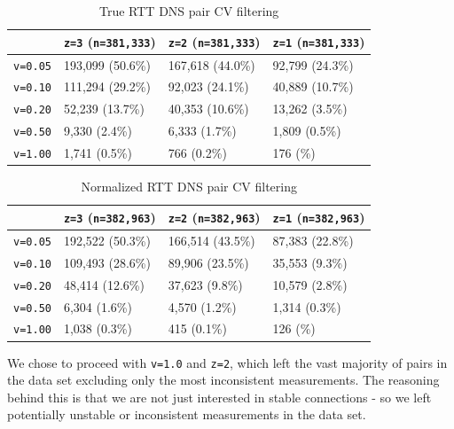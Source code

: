 \begin{table}[htb]
    \centering
    \begin{tabular}{p{1.6cm}|p{4cm}|p{4cm}|p{4cm}}
         & \texttt{z=3} (\texttt{n=381,333}) & \texttt{z=2} (\texttt{n=381,333}) & \texttt{z=1} (\texttt{n=381,333}) \\
        \hline
        \texttt{v=0.05} & 193,099 (50.6\%)  & 167,618 (44.0\%) & ‭92,799 (24.3\%) \\
        \texttt{v=0.10} & 111,294 (29.2\%) & 92,023 (24.1\%) & 40,889 (10.7\%)‬\\
        \texttt{v=0.20} & 52,239 (13.7\%) &  40,353 (10.6\%) & 13,262 (3.5\%)\\
        \texttt{v=0.50} & 9,330 (2.4\%) &  6,333 (1.7\%) & 1,809 (0.5\%)\\
        \texttt{v=1.00} & 1,741 (0.5\%) &    766 (0.2\%) & 176 (\textapprox0.0\%) \\
        \hline
    \end{tabular}
    \caption{True RTT DNS pair CV filtering}
    \label{tab:dns_unnorm_cv_filtering}
\end{table}

\begin{table}[htb]
    \centering
    \begin{tabular}{p{1.6cm}|p{4cm}|p{4cm}|p{4cm}}
         & \texttt{z=3} (\texttt{n=382,963}) & \texttt{z=2} (\texttt{n=382,963}) & \texttt{z=1} (\texttt{n=382,963}) \\
        \hline
        \texttt{v=0.05} & 192,522 (50.3\%) & 166,514 (43.5\%) & 87,383 (22.8\%) \\
        \texttt{v=0.10} & 109,493 (28.6\%) & 89,906 (23.5\%) & 35,553 (9.3\%) \\
        \texttt{v=0.20} & 48,414 (12.6\%) & 37,623 (9.8\%) & 10,579 (2.8\%) \\
        \texttt{v=0.50} & 6,304 (1.6\%) & 4,570 (1.2\%) & 1,314 (0.3\%) \\
        \texttt{v=1.00} & 1,038 (0.3\%) &    415 (0.1\%) & 126 (\textapprox0.0\%) \\  
    \end{tabular}
    \caption{Normalized RTT DNS pair CV filtering}
    \label{tab:dns_norm_cv_filtering}
\end{table}

We chose to proceed with \texttt{v=1.0} and \texttt{z=2}, which left the vast majority of pairs in the data set excluding only the most inconsistent measurements. The reasoning behind this is that we are not just interested in stable connections - so we left potentially unstable or inconsistent measurements in the data set.


